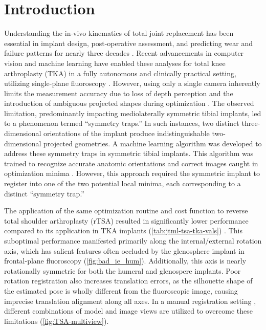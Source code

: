 \section{Introduction}
Understanding the in-vivo kinematics of total joint replacement has been essential in implant design, post-operative assessment, and predicting wear and failure patterns for nearly three decades \cite{freglyComputationalWearPrediction2005,banks2003HapPaul2004,banksRationaleResultsFixedBearing2019}.
Recent advancements in computer vision and machine learning have enabled these analyses for total knee arthroplasty (TKA) in a fully autonomous and clinically practical setting, utilizing single-plane fluoroscopy \cite{brobergValidationMachineLearning2023,jensenJointTrackMachine2023}.
However, using only a single camera inherently limits the measurement accuracy due to loss of depth perception and the introduction of ambiguous projected shapes during optimization \cite{floodAutomatedRegistration3D2018,mahfouzRobustMethodRegistration2003,zuffiModelbasedMethodReconstruction1999,banksAccurateMeasurementThreedimensional1996}.
The observed limitation, predominantly impacting mediolaterally symmetric tibial implants, led to a phenomenon termed “symmetry traps.”
In such instances, two distinct three-dimensional orientations of the implant produce indistinguishable two-dimensional projected geometries.
A machine learning algorithm was developed to address these symmetry traps in symmetric tibial implants.
This algorithm was trained to recognize accurate anatomic orientations and correct images caught in optimization minima \cite{jensenCorrectingSymmetricImplantInReview}.
However, this approach required the symmetric implant to register into one of the two potential local minima, each corresponding to a distinct “symmetry trap.”

The application of the same optimization routine and cost function \cite{floodAutomatedRegistration3D2018,jensenJointTrackMachine2023} to reverse total shoulder arthroplasty (rTSA) resulted in significantly lower performance compared to its application in TKA implants (\cref{tab:jtml-tsa-tka-vals}) \cite{jensenJointTrackMachine2023}.
This suboptimal performance manifested primarily along the internal/external rotation axis, which has salient features often occluded by the glenosphere implant in frontal-plane fluoroscopy (\cref{fig:bad_ie_hum}).
Additionally, this axis is nearly rotationally symmetric for both the humeral and glenospere implants.
Poor rotation registration also increases translation errors, as the silhouette shape of the estimated pose is wholly different from the fluoroscopic image, causing imprecise translation alignment along all axes.
In a manual registration setting \cite{muJointTrackOpenSourceEasily2007}, different combinations of model and image views are utilized to overcome these limitations (\cref{fig:TSA-multiview}).

